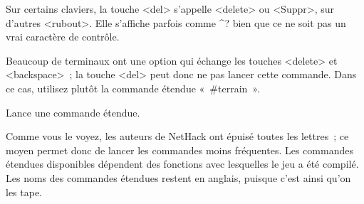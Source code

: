 \documentclass[titlepage]{article}
\begin{document}
\begin{description}
Sur certains claviers, la touche \textless{}del\textgreater{} s'appelle \textless{}delete\textgreater{} ou \textless{}Suppr\textgreater{}, sur
d'autres \textless{}rubout\textgreater{}.
Elle s'affiche parfois comme \textasciicircum{}? bien que ce ne soit pas un vrai
caractère de contrôle.


Beaucoup de terminaux ont une option qui échange les touches \textless{}delete\textgreater{} et
\textless{}backspace\textgreater{}~; la touche \textless{}del\textgreater{} peut donc ne pas lancer cette commande.
Dans ce cas, utilisez plutôt la commande étendue «~\#terrain~».

\item[{\#}]
Lance une commande étendue.



\end{description}

Comme vous le voyez, les auteurs de NetHack ont épuisé toutes les
lettres~; ce moyen permet donc de lancer les commandes moins fréquentes.
Les commandes étendues disponibles dépendent des fonctions avec lesquelles
le jeu a été compilé.
Les noms des commandes étendues restent en anglais, puisque c'est ainsi
qu'on les tape.
%
%
\end{document}

